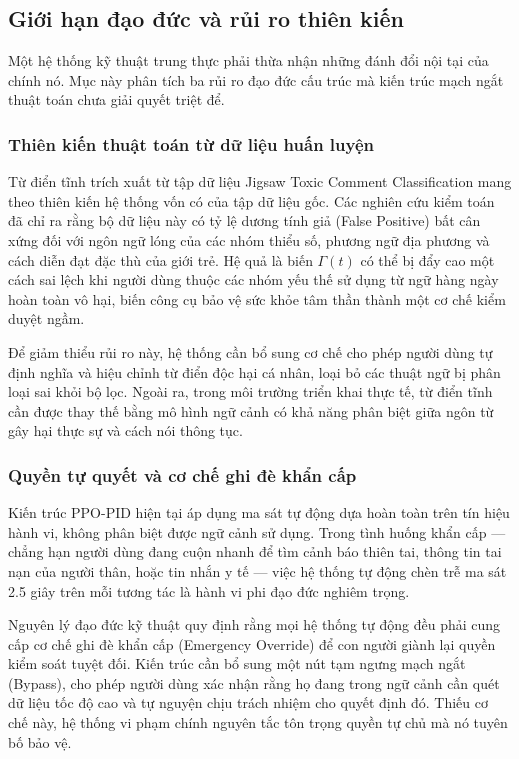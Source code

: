 \subsection{Giới hạn đạo đức và rủi ro thiên kiến}

Một hệ thống kỹ thuật trung thực phải thừa nhận những đánh đổi nội tại của chính nó. Mục này phân tích ba rủi ro đạo đức cấu trúc mà kiến trúc mạch ngắt thuật toán chưa giải quyết triệt để.

\subsubsection{Thiên kiến thuật toán từ dữ liệu huấn luyện}

Từ điển tĩnh trích xuất từ tập dữ liệu Jigsaw Toxic Comment Classification mang theo thiên kiến hệ thống vốn có của tập dữ liệu gốc. Các nghiên cứu kiểm toán đã chỉ ra rằng bộ dữ liệu này có tỷ lệ dương tính giả (False Positive) bất cân xứng đối với ngôn ngữ lóng của các nhóm thiểu số, phương ngữ địa phương và cách diễn đạt đặc thù của giới trẻ. Hệ quả là biến $\Gamma(t)$ có thể bị đẩy cao một cách sai lệch khi người dùng thuộc các nhóm yếu thế sử dụng từ ngữ hàng ngày hoàn toàn vô hại, biến công cụ bảo vệ sức khỏe tâm thần thành một cơ chế kiểm duyệt ngầm.

Để giảm thiểu rủi ro này, hệ thống cần bổ sung cơ chế cho phép người dùng tự định nghĩa và hiệu chỉnh từ điển độc hại cá nhân, loại bỏ các thuật ngữ bị phân loại sai khỏi bộ lọc. Ngoài ra, trong môi trường triển khai thực tế, từ điển tĩnh cần được thay thế bằng mô hình ngữ cảnh có khả năng phân biệt giữa ngôn từ gây hại thực sự và cách nói thông tục.

\subsubsection{Quyền tự quyết và cơ chế ghi đè khẩn cấp}

Kiến trúc PPO-PID hiện tại áp dụng ma sát tự động dựa hoàn toàn trên tín hiệu hành vi, không phân biệt được ngữ cảnh sử dụng. Trong tình huống khẩn cấp — chẳng hạn người dùng đang cuộn nhanh để tìm cảnh báo thiên tai, thông tin tai nạn của người thân, hoặc tin nhắn y tế — việc hệ thống tự động chèn trễ ma sát 2.5 giây trên mỗi tương tác là hành vi phi đạo đức nghiêm trọng.

Nguyên lý đạo đức kỹ thuật \cite{ieee_ethics} quy định rằng mọi hệ thống tự động đều phải cung cấp cơ chế ghi đè khẩn cấp (Emergency Override) để con người giành lại quyền kiểm soát tuyệt đối. Kiến trúc cần bổ sung một nút tạm ngưng mạch ngắt (Bypass), cho phép người dùng xác nhận rằng họ đang trong ngữ cảnh cần quét dữ liệu tốc độ cao và tự nguyện chịu trách nhiệm cho quyết định đó. Thiếu cơ chế này, hệ thống vi phạm chính nguyên tắc tôn trọng quyền tự chủ mà nó tuyên bố bảo vệ.

